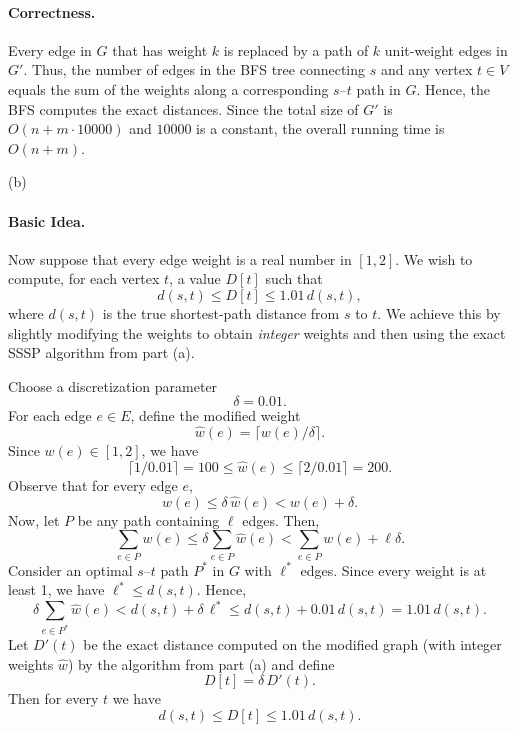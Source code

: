 \documentclass[letterpaper, 11pt]{article}
\newcommand{\1}{\mathds{1}}	%
\theoremstyle{definition}
\newenvironment{solution}{{\par\noindent\it Solution.}}{}
\begin{document}
\begin{solution}
\paragraph{Correctness.}  
Every edge in $G$ that has weight $k$ is replaced by a path of $k$ unit-weight edges in $G'$. Thus, the number of edges in the BFS tree connecting $s$ and any vertex $t\in V$ equals the sum of the weights along a corresponding $s$--$t$ path in $G$. Hence, the BFS computes the exact distances. Since the total size of $G'$ is $O(n + m\cdot 10000)$ and $10000$ is a constant, the overall running time is $O(n+m)$.

\vspace{0.2in}
(b)

\paragraph{Basic Idea.}
Now suppose that every edge weight is a real number in $[1,2]$. We wish to compute, for each vertex $t$, a value $D[t]$ such that 
\[
d(s,t) \le D[t] \le 1.01 \, d(s,t),
\]
where $d(s,t)$ is the true shortest-path distance from $s$ to $t$. We achieve this by slightly modifying the weights to obtain \emph{integer} weights and then using the exact SSSP algorithm from part (a).

Choose a discretization parameter
\[
\delta = 0.01.
\]
For each edge $e\in E$, define the modified weight
\[
\hat{w}(e) = \lceil w(e)/\delta \rceil.
\]
Since $w(e)\in [1,2]$, we have
\[
\lceil 1/0.01 \rceil = 100 \le \hat{w}(e) \le \lceil 2/0.01 \rceil = 200.
\]
Observe that for every edge $e$,
\[
w(e) \le \delta \, \hat{w}(e) < w(e) + \delta.
\]
Now, let $P$ be any path containing $\ell$ edges. Then,
\[
\sum_{e\in P} w(e) \le \delta \sum_{e\in P} \hat{w}(e) < \sum_{e\in P} w(e) + \ell \delta.
\]
Consider an optimal $s$--$t$ path $P^*$ in $G$ with $\ell^*$ edges. Since every weight is at least 1, we have $\ell^* \le d(s,t)$. Hence,
\[
\delta \sum_{e\in P^*} \hat{w}(e) < d(s,t) + \delta\, \ell^* \le d(s,t) + 0.01\, d(s,t) = 1.01\, d(s,t).
\]
Let $D'(t)$ be the exact distance computed on the modified graph (with integer weights $\hat{w}$) by the algorithm from part (a) and define
\[
D[t] = \delta \, D'(t).
\]
Then for every $t$ we have
\[
d(s,t) \le D[t] \le 1.01 \, d(s,t).
\]



\end{solution}
\end{document}
